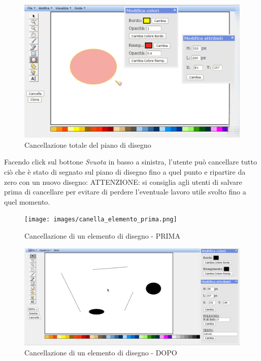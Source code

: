 \begin{figure}[!ht]
\centering
\includegraphics[scale=4]{images/ellisse.png}
\caption{Cancellazione totale del piano di disegno}
\end{figure} 

\vspace{100pt}
Facendo click sul bottone \textit{Svuota} in basso a sinistra, l'utente pu\`o cancellare tutto ci\`o che \`e stato di segnato sul piano di disegno fino a quel punto e ripartire da zero con un nuovo disegno: ATTENZIONE: si consiglia agli utenti di salvare prima di cancellare per evitare di perdere l'eventuale lavoro utile svolto fino a quel momento.

\begin{figure}[!ht]
\centering
\texttt{[image: images/canella\_elemento\_prima.png]}
\caption{Cancellazione di un elemento di disegno  - PRIMA}
\end{figure} 

\begin{figure}[!ht]
\centering
\includegraphics[scale=4]{images/cancella_elemento_dopo.png}
\caption{Cancellazione di un elemento di disegno  - DOPO}
\end{figure}

